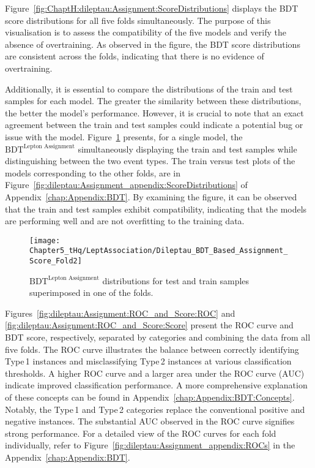 Figure~\ref{fig:ChaptH:dileptau:Assignment:ScoreDistributions} displays the BDT 
score distributions for all five folds simultaneously. The purpose of this visualisation 
is to assess the compatibility of the five models and verify the absence of overtraining. 
As observed in the figure, the BDT score distributions are consistent across the folds, 
indicating that there is no evidence of overtraining.


Additionally, it is essential to compare the distributions of the train and test 
samples for each model. The greater the similarity between these distributions, 
the better the model's performance. However, it is crucial to note that an exact 
agreement between the train and test samples could indicate a potential bug or 
issue with the model.
Figure~\ref{fig:dileptau:Assignment_appendix:ScoreDistributions:Example}
presents, for a single model, the $\text{BDT}^{\text{Lepton Assignment}}$ simultaneously displaying 
the train and test samples while distinguishing between the two event types.
The train versus test plots of the models corresponding to the other folds, 
are in Figure~\ref{fig:dileptau:Assignment_appendix:ScoreDistributions}
of Appendix~\ref{chap:Appendix:BDT}.
By examining the figure, it can be 
observed that the train and test samples exhibit compatibility, indicating that the 
models are performing well and are not overfitting to the training data.


\begin{figure}[h]
\centering
\texttt{[image: Chapter5\_tHq/LeptAssociation/Dileptau\_BDT\_Based\_Assignment\_Score\_Fold2]}
\caption{$\text{BDT}^{\text{Lepton Assignment}}$ distributions for test and train samples superimposed in one of the folds.}
\label{fig:dileptau:Assignment_appendix:ScoreDistributions:Example}
\end{figure}


Figures~\ref{fig:dileptau:Assignment:ROC_and_Score:ROC} and 
\ref{fig:dileptau:Assignment:ROC_and_Score:Score} present the 
ROC curve and BDT score, respectively, separated by categories and 
combining the data from all five folds. The ROC curve illustrates the 
balance between correctly identifying Type$\,$1 instances and misclassifying 
Type$\,$2 instances at various classification thresholds. A higher ROC 
curve and a larger area under the ROC curve (AUC) indicate improved 
classification performance. A more comprehensive explanation of these 
concepts can be found in Appendix~\ref{chap:Appendix:BDT:Concepts}. 
Notably, the Type$\,$1 and Type$\,$2 categories replace the conventional 
positive and negative instances. The substantial AUC observed in the ROC 
curve signifies strong performance. For a detailed view of the ROC curves for
each fold individually, refer to Figure~\ref{fig:dileptau:Assignment_appendix:ROCs}
in the Appendix~\ref{chap:Appendix:BDT}.

